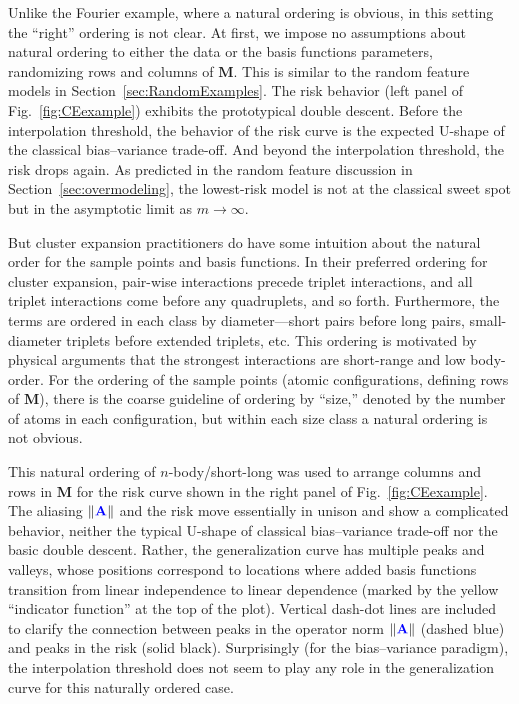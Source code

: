 \documentclass[twocolumn,aps,prx,superscriptaddress,10pt]{revtex4-2}
\newcommand{\0}{\bm{0}}
\newcommand{\bbA}{{\color{blue}{\mathbf{A}}}}  %
\newcommand{\bbM}{\mathbf{M}}
\begin{document}
Unlike the Fourier example, where a natural ordering is obvious, in this setting the ``right'' ordering is not clear. 
At first, we impose no assumptions about natural ordering to either the data or the basis functions parameters, randomizing rows and columns of $\bbM$. This is similar to the random feature models in Section~\ref{sec:RandomExamples}. 
The risk behavior (left panel of Fig.~\ref{fig:CEexample}) exhibits the prototypical double descent. Before the interpolation threshold, the behavior of the risk curve is the expected U-shape of the classical bias--variance trade-off. And beyond the interpolation threshold, the risk drops again.
As predicted in the random feature discussion in Section~\ref{sec:overmodeling}, the lowest-risk model is not at the classical sweet spot but in the asymptotic limit as $m\to \infty$. 

But cluster expansion practitioners do have some intuition about the natural order for the sample points and basis functions.
In their preferred ordering for cluster expansion, pair-wise interactions precede triplet interactions, and all triplet interactions come before any quadruplets, and so forth. Furthermore, the terms are ordered in each
class by diameter---short pairs before long pairs, small-diameter triplets before extended triplets, etc. 
This ordering is motivated by physical arguments that the strongest interactions are short-range and low body-order. For the ordering of the sample points (atomic configurations, defining rows of $\bbM$), there is the coarse guideline of ordering by ``size,'' denoted by the number of atoms in each configuration, but within each size class a natural ordering is not obvious.

This natural ordering of $n$-body/short-long was used to arrange columns and rows in $\bbM$ for the risk curve shown in the right panel of Fig.~\ref{fig:CEexample}. The aliasing $\|\bbA\|$ and the risk move essentially in unison and show a complicated behavior, neither the typical U-shape of classical bias--variance trade-off nor the basic double descent. Rather, the generalization curve has multiple peaks and valleys, whose positions correspond to locations where added basis functions transition from linear independence to linear dependence (marked by the yellow ``indicator function'' at the top of the plot).  Vertical dash-dot lines are included to clarify the connection between peaks in the operator norm $\|\bbA\|$ (dashed blue) and peaks in the risk (solid black).
 Surprisingly (for the bias--variance paradigm), the interpolation threshold does not seem to play any role in the generalization curve for this naturally ordered case. 
\end{document}
